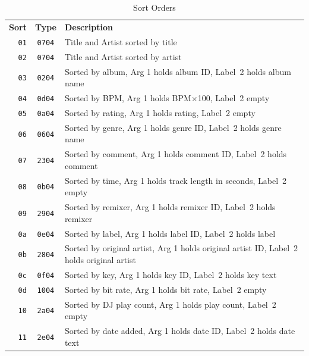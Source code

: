 \documentclass[11pt]{article}
\begin{document}
\begin{longtabu}{rcX}
  \toprule
  {\bfseries Sort} & {\bfseries Type} & {\bfseries Description} \endhead

  \bottomrule \\
  \caption{Sort Orders} \endfoot

  {\tt 01} & {\tt 0704} & Title and Artist sorted by
  title \label{table:sortOrders} \\

  {\tt 02} & {\tt 0704} & Title and Artist sorted by artist \\

  {\tt 03} & {\tt 0204} & Sorted by album, Arg 1 holds album ID,
  Label~2 holds album name \\

  {\tt 04} & {\tt 0d04} & Sorted by BPM, Arg 1 holds BPM$\times$100,
  Label~2 empty \\

  {\tt 05} & {\tt 0a04} & Sorted by rating, Arg 1 holds rating,
  Label~2 empty \\

  {\tt 06} & {\tt 0604} & Sorted by genre, Arg 1 holds genre ID,
  Label~2 holds genre name \\

  {\tt 07} & {\tt 2304} & Sorted by comment, Arg 1 holds comment ID,
  Label~2 holds comment \\

  {\tt 08} & {\tt 0b04} & Sorted by time, Arg 1 holds track length in
  seconds, Label~2 empty \\

  {\tt 09} & {\tt 2904} & Sorted by remixer, Arg 1 holds remixer ID,
  Label~2 holds remixer \\

  {\tt 0a} & {\tt 0e04} & Sorted by label, Arg 1 holds label ID,
  Label~2 holds label \\

  {\tt 0b} & {\tt 2804} & Sorted by original artist, Arg 1 holds
  original artist ID, Label~2 holds original artist \\

  {\tt 0c} & {\tt 0f04} & Sorted by key, Arg 1 holds key ID, Label~2
  holds key text \\

  {\tt 0d} & {\tt 1004} & Sorted by bit rate, Arg 1 holds bit rate,
  Label~2 empty \\

  {\tt 10} & {\tt 2a04} & Sorted by DJ play count, Arg 1 holds play
  count, Label~2 empty \\

  {\tt 11} & {\tt 2e04} & Sorted by date added, Arg 1 holds date ID,
  Label~2 holds date text \\

\end{longtabu}
\end{document}
